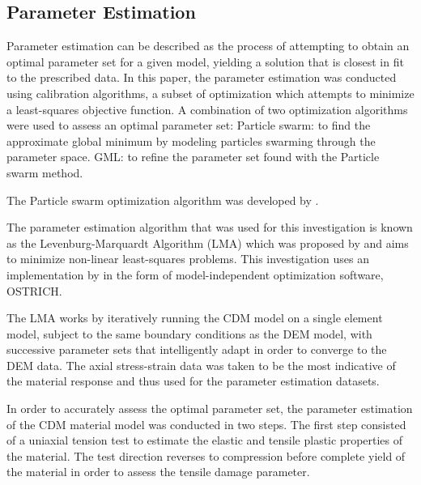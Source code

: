 \subsection{Parameter Estimation}
Parameter estimation can be described as the process of attempting to obtain an optimal parameter set for a given model, yielding a solution that is closest in fit to the prescribed data. In this paper, the parameter estimation was conducted using calibration algorithms, a subset of optimization which attempts to minimize a least-squares objective function. 
A combination of two optimization algorithms were used to assess an optimal parameter set:
Particle swarm: to find the approximate global minimum by modeling particles swarming through the parameter space. 
GML: to refine the parameter set found with the Particle swarm method.

The Particle swarm optimization algorithm was developed by . 

The parameter estimation algorithm that was used for this investigation is known as the Levenburg-Marquardt Algorithm (LMA) which was proposed by \citet{marquardt_algorithm_1963} and aims to minimize non-linear least-squares problems. This investigation uses an implementation by \citet{matott_ostrich:_2008} in the form of model-independent optimization software, OSTRICH.

The LMA works by iteratively running the CDM model on a single element model, subject to the same boundary conditions as the DEM model, with successive parameter sets that intelligently adapt in order to converge to the DEM data. The axial stress-strain data was taken to be the most indicative of the material response and thus used for the parameter estimation datasets.

In order to accurately assess the optimal parameter set, the parameter estimation of the CDM material model was conducted in two steps. The first step consisted of a uniaxial tension test to estimate the elastic and tensile plastic properties of the material. The test direction reverses to compression before complete yield of the material in order to assess the tensile damage parameter. 

